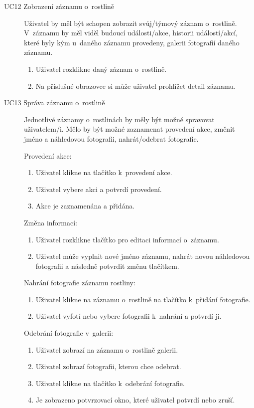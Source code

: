 \documentclass[thesis=M,czech]{FITthesis}[2019/12/23]
\begin{document}
\begin{description}
    \item[UC12 Zobrazení záznamu o~rostlině] Uživatel by měl být schopen zobrazit svůj/týmový záznam o~rostlině. V~záznamu by měl viděl budoucí události/akce, historii událostí/akcí, které byly kým u~daného záznamu provedeny, galerii fotografií daného záznamu.
    \begin{enumerate}
        \item Uživatel rozklikne daný záznam o~rostlině.
        \item Na příslušné obrazovce si může uživatel prohlížet detail záznamu.
    \end{enumerate}
    
    \item[UC13 Správa záznamu o~rostlině] Jednotlivé záznamy o~rostlinách by měly být možné spravovat uživatelem/i. Mělo by být možné zaznamenat provedení akce, změnit jméno a náhledovou fotografii, nahrát/odebrat fotografie.
    
    Provedení akce:
    \begin{enumerate}
        \item Uživatel klikne na tlačítko k~provedení akce.
        \item Uživatel vybere akci a potvrdí provedení.
        \item Akce je zaznamenána a přidána.
    \end{enumerate}

    \newpage
    Změna informací:
    \begin{enumerate}
        \item Uživatel rozklikne tlačítko pro editaci informací o~záznamu.
        \item Uživatel může vyplnit nové jméno záznamu, nahrát novou náhledovou fotografii a následně potvrdit změnu tlačítkem.
    \end{enumerate}
    
    Nahrání fotografie záznamu rostliny:
    \begin{enumerate}
        \item Uživatel klikne na záznamu o~rostlině na tlačítko k~přidání fotografie.
        \item Uživatel vyfotí nebo vybere fotografii k~nahrání a potvrdí ji.
    \end{enumerate}
    
    Odebrání fotografie v~galerii:
    \begin{enumerate}
        \item Uživatel zobrazí na záznamu o~rostlině galerii.
        \item Uživatel zobrazí fotografii, kterou chce odebrat.
        \item Uživatel klikne na tlačítko k~odebrání fotografie.
        \item Je zobrazeno potvrzovací okno, které uživatel potvrdí nebo zruší.
    \end{enumerate}
    

\end{description}
\end{document}
